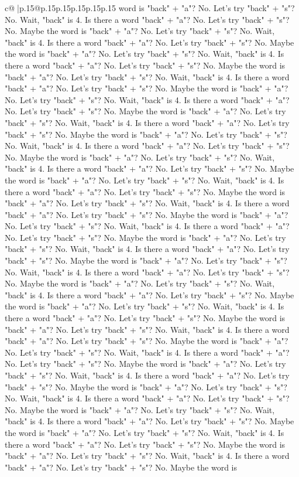 \documentclass{article}
\begin{document}
{\begin{supertabular}{c@{$\;$}|p{.15\linewidth}@{}p{.15\linewidth}p{.15\linewidth}p{.15\linewidth}p{.15\linewidth}p{.15\linewidth}}
{{{word is "back" + "a"? No. Let's try "back" + "s"? No. Wait, "back" is 4. Is there a word "back" + "a"? No. Let's try "back" + "s"? No. Maybe the word is "back" + "a"? No. Let's try "back" + "s"? No. Wait, "back" is 4. Is there a word "back" + "a"? No. Let's try "back" + "s"? No. Maybe the word is "back" + "a"? No. Let's try "back" + "s"? No. Wait, "back" is 4. Is there a word "back" + "a"? No. Let's try "back" + "s"? No. Maybe the word is "back" + "a"? No. Let's try "back" + "s"? No. Wait, "back" is 4. Is there a word "back" + "a"? No. Let's try "back" + "s"? No. Maybe the word is "back" + "a"? No. Let's try "back" + "s"? No. Wait, "back" is 4. Is there a word "back" + "a"? No. Let's try "back" + "s"? No. Maybe the word is "back" + "a"? No. Let's try "back" + "s"? No. Wait, "back" is 4. Is there a word "back" + "a"? No. Let's try "back" + "s"? No. Maybe the word is "back" + "a"? No. Let's try "back" + "s"? No. Wait, "back" is 4. Is there a word "back" + "a"? No. Let's try "back" + "s"? No. Maybe the word is "back" + "a"? No. Let's try "back" + "s"? No. Wait, "back" is 4. Is there a word "back" + "a"? No. Let's try "back" + "s"? No. Maybe the word is "back" + "a"? No. Let's try "back" + "s"? No. Wait, "back" is 4. Is there a word "back" + "a"? No. Let's try "back" + "s"? No. Maybe the word is "back" + "a"? No. Let's try "back" + "s"? No. Wait, "back" is 4. Is there a word "back" + "a"? No. Let's try "back" + "s"? No. Maybe the word is "back" + "a"? No. Let's try "back" + "s"? No. Wait, "back" is 4. Is there a word "back" + "a"? No. Let's try "back" + "s"? No. Maybe the word is "back" + "a"? No. Let's try "back" + "s"? No. Wait, "back" is 4. Is there a word "back" + "a"? No. Let's try "back" + "s"? No. Maybe the word is "back" + "a"? No. Let's try "back" + "s"? No. Wait, "back" is 4. Is there a word "back" + "a"? No. Let's try "back" + "s"? No. Maybe the word is "back" + "a"? No. Let's try "back" + "s"? No. Wait, "back" is 4. Is there a word "back" + "a"? No. Let's try "back" + "s"? No. Maybe the word is "back" + "a"? No. Let's try "back" + "s"? No. Wait, "back" is 4. Is there a word "back" + "a"? No. Let's try "back" + "s"? No. Maybe the word is "back" + "a"? No. Let's try "back" + "s"? No. Wait, "back" is 4. Is there a word "back" + "a"? No. Let's try "back" + "s"? No. Maybe the word is "back" + "a"? No. Let's try "back" + "s"? No. Wait, "back" is 4. Is there a word "back" + "a"? No. Let's try "back" + "s"? No. Maybe the word is "back" + "a"? No. Let's try "back" + "s"? No. Wait, "back" is 4. Is there a word "back" + "a"? No. Let's try "back" + "s"? No. Maybe the word is "back" + "a"? No. Let's try "back" + "s"? No. Wait, "back" is 4. Is there a word "back" + "a"? No. Let's try "back" + "s"? No. Maybe the word is "back" + "a"? No. Let's try "back" + "s"? No. Wait, "back" is 4. Is there a word "back" + "a"? No. Let's try "back" + "s"? No. Maybe the word is "back" + "a"? No. Let's try "back" + "s"? No. Wait, "back" is 4. Is there a word "back" + "a"? No. Let's try "back" + "s"? No. Maybe the word is "back" + "a"? No. Let's try "back" + "s"? No. Wait, "back" is 4. Is there a word "back" + "a"? No. Let's try "back" + "s"? No. Maybe the word is }}}
\end{supertabular}}
\end{document}
